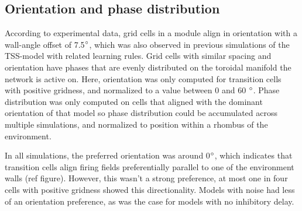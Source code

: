 \documentclass{article}
\begin{document}
    \subsection{Orientation and phase distribution}

    According to experimental data, grid cells in a module align in orientation with a wall-angle offset of 7.5\(\degree\), which was also observed in previous simulations of the TSS-model with related learning rules. Grid cells with similar spacing and orientation have phases that are evenly distributed on the toroidal manifold the network is active on. Here, orientation was only computed for transition cells with positive gridness, and normalized to a value between 0 and 60 \(\degree\). Phase distribution was only computed on cells that aligned with the dominant orientation of that model so phase distribution could be accumulated across multiple simulations, and normalized to position within a rhombus of the environment.

    In all simulations, the preferred orientation was around 0\(\degree\), which indicates that transition cells align firing fields preferentially parallel to one of the environment walls (ref figure). However, this wasn't a strong preference, at most one in four cells with positive gridness showed this directionality. Models with noise had less of an orientation preference, as was the case for models with no inhibitory delay. 
    
\end{document}
